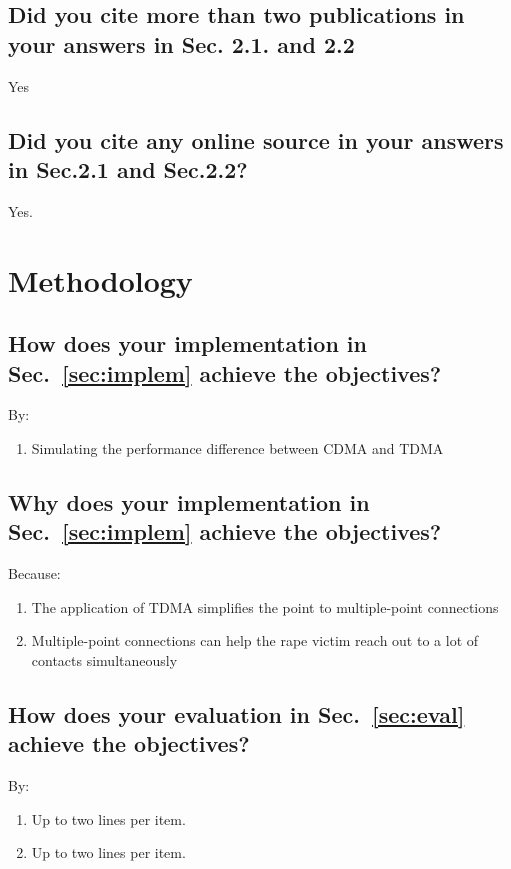 \subsection{Did you cite more than two publications in your answers in Sec. 2.1. and 2.2}
Yes
	
\subsection{Did you cite any online source in your answers in Sec.2.1 and Sec.2.2?}
Yes.


\section{Methodology}

\subsection{How does your implementation in Sec.~\ref{sec:implem} achieve the objectives?}
By:
\begin{enumerate}
	\item Simulating the performance difference between CDMA and TDMA
\end{enumerate}

\subsection{Why does your implementation in Sec.~\ref{sec:implem} achieve the objectives?}
Because:
\begin{enumerate}
	\item The application of TDMA simplifies the point to multiple-point connections
	
	\item Multiple-point connections can help the rape victim reach out to a lot of contacts simultaneously
	
\end{enumerate}

\subsection{How does your evaluation in Sec.~\ref{sec:eval} achieve the objectives?}
By:
\begin{enumerate}
	\item Up to two lines per item.
	\item Up to two lines per item.
\end{enumerate}

